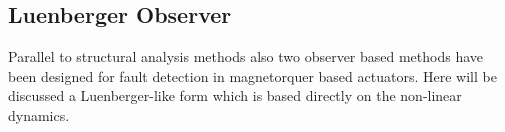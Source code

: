 \subsection{Luenberger Observer} \label{sec:simpleObserver}

Parallel to structural analysis methods also two observer based methods have been designed for fault detection in magnetorquer based actuators. Here will be discussed a Luenberger-like form which is based directly on the non-linear dynamics.  